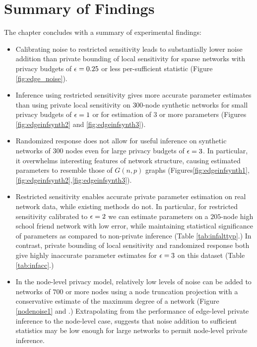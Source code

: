 \newpage
 \section{Summary of Findings}\label{sec:summary_findings}

The chapter concludes with a summary of experimental findings:

\begin{itemize}
	\item Calibrating noise to restricted sensitivity leads to substantially lower noise addition than private bounding of local sensitivity for sparse networks with privacy budgets of $\epsilon = 0.25$ or less per-sufficient statistic (Figure \ref{fig:edge_noise}).
	\item Inference using restricted sensitivity gives more accurate parameter estimates than using private local sensitivity on $300$-node synthetic networks for small privacy budgets of $\epsilon=1$ or for estimation of $3$ or more parameters (Figures \ref{fig:edgeinfsynth2} and \ref{fig:edgeinfsynth3}). 
	\item Randomized response does not allow for useful inference on synthetic networks of $300$ nodes even for large privacy budgets of $\epsilon=3$. In particular, it overwhelms interesting features of network structure, causing estimated parameters to resemble those of $G(n,p)$ graphs (Figures\ref{fig:edgeinfsynth1},\ref{fig:edgeinfsynth2},\ref{fig:edgeinfsynth3}). %
	\item Restricted sensitivity enables accurate private parameter estimation on real network data, while existing methods do not. In particular, for restricted sensitivity calibrated to $\epsilon=2$ we can estimate parameters on a $205$-node high school friend network with low error, while maintaining statistical significance of parameters as compared to non-private inference (Table \ref{tab:infalttyp}.) In contrast, private bounding of local sensitivity and randomized response both give highly inaccurate parameter estimates for $\epsilon=3$ on this dataset (Table \ref{tab:infacc}.) 
	\item In the node-level privacy model, relatively low levels of noise can be added to networks of $700$ or more nodes using a node truncation projection with a conservative estimate of the maximum degree of a network (Figure \ref{nodenoise1} and .) Extrapolating from the performance of edge-level private inference to the node-level case, suggests that noise addition to sufficient statistics may be low enough for large networks to permit node-level private inference.
\end{itemize}  

